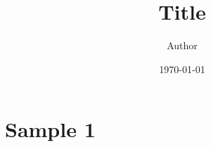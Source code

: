 \documentclass[]{article}
\title{Title}
\author{Author}
\date\today
\begin{document}
\maketitle %

\section*{Sample 1}
\end{document}
